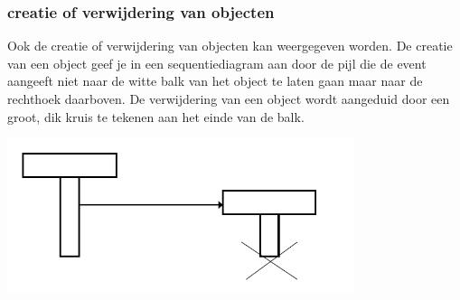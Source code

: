 \subsubsection{creatie of verwijdering van objecten}

Ook de creatie of verwijdering van objecten kan weergegeven worden.
De creatie van een object geef je in een sequentiediagram aan door de pijl die de event aangeeft niet naar de witte balk van het object te laten gaan maar naar de rechthoek daarboven. De verwijdering van een object wordt aangeduid door een groot, dik kruis te tekenen aan het einde van de balk.



\begin{center}
\includegraphics[width=4in]{img/destr1}%
\end{center}


